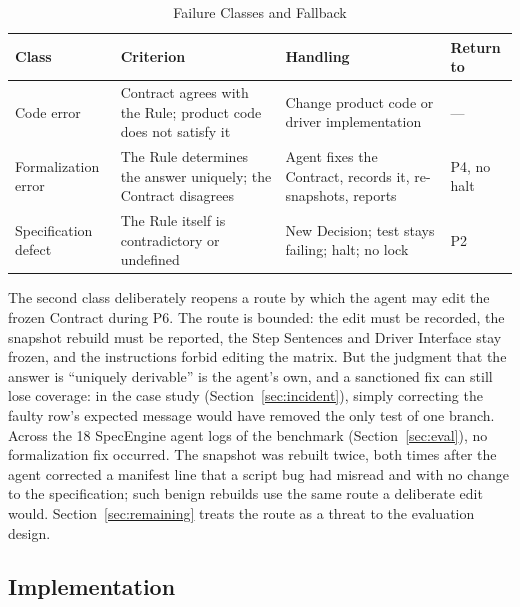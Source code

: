 \documentclass[conference]{IEEEtran}
\begin{document}
\begin{table}[t]
\caption{Failure Classes and Fallback}\label{tab:failures}
\centering\footnotesize
\begin{tabularx}{\columnwidth}{@{}>{\raggedright\arraybackslash}p{}LL>{\raggedright\arraybackslash}p{0.12\columnwidth}@{}}
\toprule
Class & Criterion & Handling & Return to \\
\midrule
Code error & Contract agrees with the Rule; product code does not satisfy it & Change product code or driver implementation & --- \\
Formalization error & The Rule determines the answer uniquely; the Contract disagrees & Agent fixes the Contract, records it, re-snapshots, reports & P4, no halt \\
Specification defect & The Rule itself is contradictory or undefined & New Decision; test stays failing; halt; no lock & P2 \\
\bottomrule
\end{tabularx}
\end{table}

The second class deliberately reopens a route by which the agent may edit the frozen Contract during P6. The route is bounded: the edit must be recorded, the snapshot rebuild must be reported, the Step Sentences and Driver Interface stay frozen, and the instructions forbid editing the matrix. But the judgment that the answer is ``uniquely derivable'' is the agent's own, and a sanctioned fix can still lose coverage: in the case study (Section~\ref{sec:incident}), simply correcting the faulty row's expected message would have removed the only test of one branch. Across the 18 SpecEngine agent logs of the benchmark (Section~\ref{sec:eval}), no formalization fix occurred. The snapshot was rebuilt twice, both times after the agent corrected a manifest line that a script bug had misread and with no change to the specification; such benign rebuilds use the same route a deliberate edit would. Section~\ref{sec:remaining} treats the route as a threat to the evaluation design.

\subsection{Implementation}\label{sec:impl}
\end{document}
